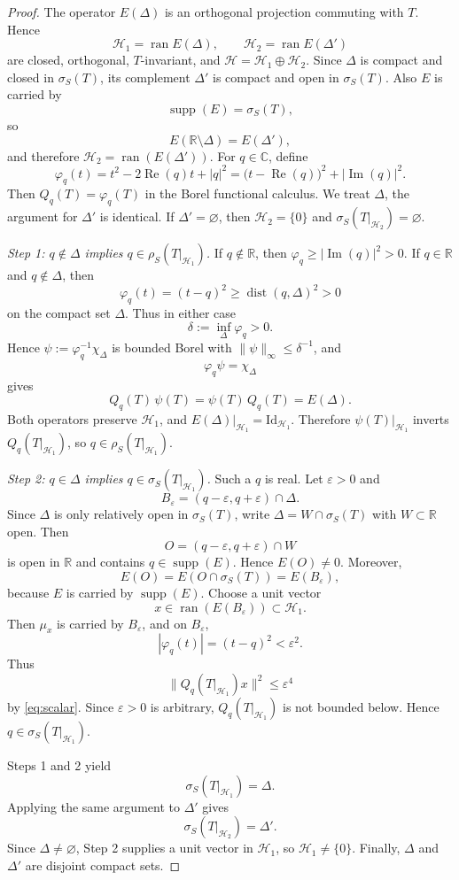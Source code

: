 \documentclass[10pt,a4paper]{amsart}
\theoremstyle{plain}
\theoremstyle{definition}
\theoremstyle{remark}
\newcommand{\RR}{\mathbb R}
\newcommand{\CC}{\mathbb C}
\newcommand{\Id}{\mathrm{Id}}
\newcommand{\HS}{\mathcal H}
\newcommand{\sigS}{\sigma_S}
\newcommand{\rhoS}{\rho_S}
\DeclareMathOperator{\ran}{ran}
\DeclareMathOperator{\dist}{dist}
\DeclareMathOperator{\supp}{supp}
\DeclareMathOperator{\Rea}{Re}
\DeclareMathOperator{\Ima}{Im}
\begin{document}
\begin{proof}
The operator \(E(\Delta)\) is an orthogonal projection commuting with \(T\). Hence
\[
\HS_1=\ran E(\Delta),\qquad \HS_2=\ran E(\Delta')
\]
are closed, orthogonal, \(T\)-invariant, and \(\HS=\HS_1\oplus\HS_2\). Since \(\Delta\) is compact and closed in \(\sigS(T)\), its complement \(\Delta'\) is compact and open in \(\sigS(T)\). Also \(E\) is carried by $$\supp(E)=\sigS(T),$$ so
\[
E(\RR\setminus\Delta)=E(\Delta'),
\]
and therefore \(\HS_2=\ran(E(\Delta'))\). For \(q\in\CC\), define
\[
\varphi_q(t)=t^2-2\Rea(q)t+|q|^2
=\bigl(t-\Rea(q)\bigr)^2+|\Ima(q)|^2 .
\]
Then \(Q_q(T)=\varphi_q(T)\) in the Borel functional calculus. We treat \(\Delta\), the argument for \(\Delta'\) is identical. If \(\Delta'=\varnothing\), then \(\HS_2=\{0\}\) and \(\sigS(T|_{\HS_2})=\varnothing\).

\emph{Step 1: \(q\notin\Delta\) implies \(q\in\rhoS(T|_{\HS_1})\).}
If \(q\notin\RR\), then \(\varphi_q\ge |\Ima(q)|^2>0\). If \(q\in\RR\) and \(q\notin\Delta\), then
\[
\varphi_q(t)=(t-q)^2\ge \dist(q,\Delta)^2>0
\]
on the compact set \(\Delta\). Thus in either case
\[
\delta:=\inf_{\Delta}\varphi_q>0.
\]
Hence \(\psi:=\varphi_q^{-1}\chi_\Delta\) is bounded Borel with \(\|\psi\|_\infty\le\delta^{-1}\), and
\[
\varphi_q\psi=\chi_\Delta
\]
gives
\[
Q_q(T)\,\psi(T)=\psi(T)\,Q_q(T)=E(\Delta).
\]
Both operators preserve \(\HS_1\), and \(E(\Delta)|_{\HS_1}=\Id_{\HS_1}\). Therefore \(\psi(T)|_{\HS_1}\) inverts \(Q_q(T|_{\HS_1})\), so \(q\in\rhoS(T|_{\HS_1})\).

\emph{Step 2: \(q\in\Delta\) implies \(q\in\sigS(T|_{\HS_1})\).}
Such a \(q\) is real. Let \(\varepsilon>0\) and
\[
B_\varepsilon=(q-\varepsilon,q+\varepsilon)\cap\Delta .
\]
Since \(\Delta\) is only relatively open in \(\sigS(T)\), write \(\Delta=W\cap\sigS(T)\) with \(W\subset\RR\) open. Then
\[
O=(q-\varepsilon,q+\varepsilon)\cap W
\]
is open in \(\RR\) and contains \(q\in\supp(E)\). Hence \(E(O)\neq0\). Moreover,
\[
E(O)=E(O\cap\sigS(T))=E(B_\varepsilon),
\]
because \(E\) is carried by \(\supp(E)\). Choose a unit vector
\[
x\in\ran(E(B_\varepsilon))\subset\HS_1 .
\]
Then \(\mu_x\) is carried by \(B_\varepsilon\), and on \(B_\varepsilon\),
\[
|\varphi_q(t)|=(t-q)^2<\varepsilon^2 .
\]
Thus
\[
\|Q_q(T|_{\HS_1})x\|^2\le\varepsilon^4
\]
by \eqref{eq:scalar}. Since \(\varepsilon>0\) is arbitrary, \(Q_q(T|_{\HS_1})\) is not bounded below. Hence \(q\in\sigS(T|_{\HS_1})\).

Steps 1 and 2 yield
\[
\sigS(T|_{\HS_1})=\Delta .
\]
Applying the same argument to \(\Delta'\) gives
\[
\sigS(T|_{\HS_2})=\Delta' .
\]
Since \(\Delta\neq\varnothing\), Step 2 supplies a unit vector in \(\HS_1\), so \(\HS_1\neq\{0\}\). Finally, \(\Delta\) and \(\Delta'\) are disjoint compact sets.
\end{proof}
\end{document}
